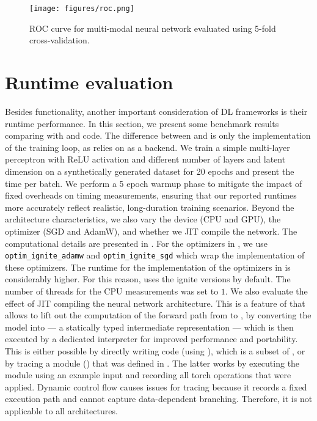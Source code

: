 \documentclass[article]{jss}
\theoremstyle{definition}
\begin{document}
\begin{figure}[H]
    \centering
    \texttt{[image: figures/roc.png]}
    \caption{ROC curve for multi-modal neural network evaluated using 5-fold cross-validation.}
    \label{fig:roc-curve}
\end{figure}

\section{Runtime evaluation}\label{sec:benchmarks}

Besides functionality, another important consideration of DL frameworks is their runtime performance.
In this section, we present some benchmark results comparing \mlrttorch{} with \torch{} and \pytorch{} code.
The difference between \mlrttorch{} and \torch{} is only the implementation of the training loop, as \mlrttorch{} relies on \torch{} as a backend.
We train a simple multi-layer perceptron with ReLU activation and different number of layers and latent dimension on a synthetically generated dataset for 20 epochs and present the time per batch.
We perform a 5 epoch warmup phase to mitigate the impact of fixed overheads on timing measurements, ensuring that our reported runtimes more accurately reflect realistic, long-duration training scenarios.
Beyond the architecture characteristics, we also vary the device (CPU and GPU), the optimizer (SGD and AdamW), and whether we JIT compile the network.
The computational details are presented in .
For the optimizers in \rlang{}, we use \texttt{optim\_ignite\_adamw} and \texttt{optim\_ignite\_sgd} which wrap the \libtorch{} \cpp{} implementation of these optimizers.
The runtime for the \rlang{} implementation of the optimizers in \torch{} is considerably higher.
For this reason, \mlrttorch{} uses the ignite versions by default.
The number of threads for the CPU measurements was set to $1$.
We also evaluate the effect of JIT compiling the neural network architecture.
This is a feature of  that allows to lift out the computation of the forward path from  to \cpp{}, by converting the model into  — a statically typed intermediate representation — which is then executed by a dedicated \cpp{} interpreter for improved performance and portability.
This is either possible by directly writing  code (using ), which is a subset of , or by tracing a module () that was defined in .
The latter works by executing the module using an example input and recording all torch operations that were applied.
Dynamic control flow causes issues for tracing because it records a fixed execution path and cannot capture data-dependent branching.
Therefore, it is not applicable to all architectures.
\end{document}
